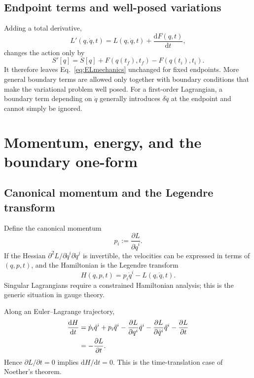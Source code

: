\documentclass[11pt]{article}
\newcommand{\dd}{\mathrm{d}}
\begin{document}
\subsection{Endpoint terms and well-posed variations}

Adding a total derivative,
\begin{equation}
  L'(q,\dot q,t)=L(q,\dot q,t)+\frac{\dd F(q,t)}{\dd t},
\end{equation}
changes the action only by
\begin{equation}
  S'[q]=S[q]+F(q(t_f),t_f)-F(q(t_i),t_i).
\end{equation}
It therefore leaves Eq.~\eqref{eq:ELmechanics} unchanged for fixed endpoints.
More general boundary terms are allowed only together with boundary
conditions that make the variational problem well posed. For a first-order
Lagrangian, a boundary term depending on \(\dot q\) generally introduces
\(\delta\dot q\) at the endpoint and cannot simply be ignored.

\section{Momentum, energy, and the boundary one-form}

\subsection{Canonical momentum and the Legendre transform}

Define the canonical momentum
\begin{equation}
  p_i:=\frac{\partial L}{\partial\dot q^i}.
  \label{eq:momentum}
\end{equation}
If the Hessian \(\partial^2L/\partial\dot q^i\partial\dot q^j\) is invertible,
the velocities can be expressed in terms of \((q,p,t)\), and the Hamiltonian is
the Legendre transform
\begin{equation}
  H(q,p,t)=p_i\dot q^i-L(q,\dot q,t).
  \label{eq:Hamiltonian}
\end{equation}
Singular Lagrangians require a constrained Hamiltonian analysis; this is the
generic situation in gauge theory.

Along an Euler--Lagrange trajectory,
\begin{align}
  \frac{\dd H}{\dd t}
  &=\dot p_i\dot q^i+p_i\ddot q^i
  -\frac{\partial L}{\partial q^i}\dot q^i
  -\frac{\partial L}{\partial\dot q^i}\ddot q^i
  -\frac{\partial L}{\partial t}\notag\\
  &=-\frac{\partial L}{\partial t}.
  \label{eq:energyidentity}
\end{align}
Hence \(\partial L/\partial t=0\) implies \(\dd H/\dd t=0\). This is the
time-translation case of Noether's theorem.
\end{document}
